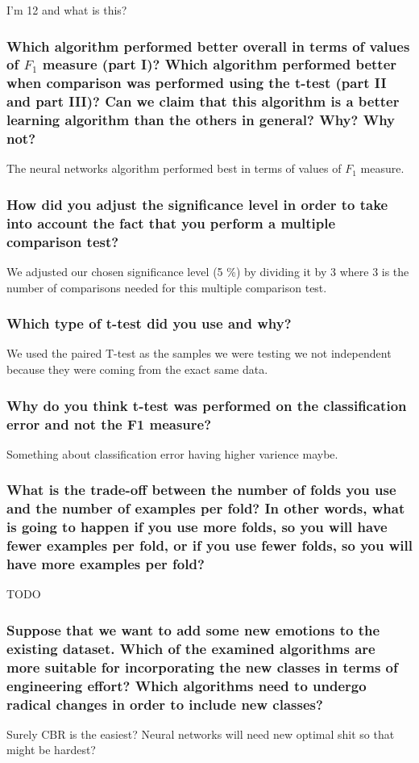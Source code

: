 \documentclass[12pt]{article}
\begin{document}
I'm 12 and what is this?

\subsubsection*{Which algorithm performed better overall in terms of values of $F_1$ measure (part I)? Which algorithm performed better when comparison was performed using the t-test (part II and part III)? Can we claim that this algorithm is a better learning algorithm than the others in general? Why? Why not?}

The neural networks algorithm performed best in terms of values of $F_1$ measure.

\subsubsection*{How did you adjust the significance level in order to take into account the fact that you perform a multiple comparison test?}

We adjusted our chosen significance level (5 \%) by dividing it by 3 where 3 is the number of comparisons needed for this multiple comparison test.

\subsubsection*{Which type of t-test did you use and why?}

We used the paired T-test as the samples we were testing we not independent because they were coming from the exact same data.

\subsubsection*{Why do you think t-test was performed on the classification error and not the F1 measure?}

Something about classification error having higher varience maybe.

\subsubsection*{What is the trade-off between the number of folds you use and the number of examples per fold? In other words, what is going to happen if you use more folds, so you will have fewer examples per fold, or if you use fewer folds, so you will have more examples per fold?}

TODO

\subsubsection*{Suppose that we want to add some new emotions to the existing dataset. Which of the examined algorithms are more suitable for incorporating the new classes in terms of engineering effort? Which algorithms need to undergo radical changes in order to include new classes?}

Surely CBR is the easiest? Neural networks will need new optimal shit so that might be hardest?
\end{document}
